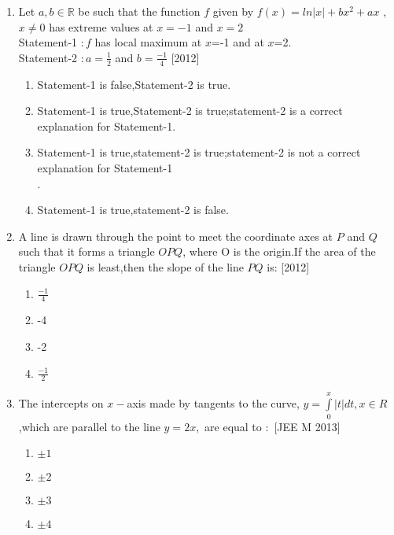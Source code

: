 \documentclass[journal,12pt,twocolumn]{IEEEtran}
\theoremstyle{remark}
\begin{document}
\begin{enumerate}
\item Let $a,b\in \mathbb R$ be such that the function $f$ given by $f(x)=ln|x|+bx^{2}+ax$ , $x \neq 0$ has extreme values at $x=-1$ and $x=2$\\
Statement-1 $: f$ has local maximum at $x$=-1 and at $x$=2.\\
Statement-2 $: a=\frac{1}{2}$ and $b=\frac{-1}{4}$ \hfill{[2012]}\\
\begin{enumerate}
    \item Statement-1 is false,Statement-2 is true.\\
    \item Statement-1 is true,Statement-2 is true;statement-2 is a correct explanation for Statement-1.\\
    \item Statement-1 is true,statement-2 is true;statement-2 is not a correct explanation for Statement-1\\.
    \item Statement-1 is true,statement-2 is false.\\
\end{enumerate}

\item A line is drawn through the point to meet the coordinate axes at $P$ and $Q$ such that it forms a triangle $OPQ$, where O is the origin.If the area of the triangle $OPQ$ is least,then the slope of the line $PQ$ is: \hfill{[2012]}\\
\begin{enumerate}
    \item  $\frac{-1}{4}$\\
    \item  -4\\
    \item  -2\\
    \item  $\frac{-1}{2}$\\
\end{enumerate}
\item The intercepts on $x-$axis made by tangents to the curve, $y=\int\limits_0^x|t|dt,x\in R$,which are parallel to the line $y=2x,$ are equal to $:$ {[JEE M 2013]}\\
\begin{enumerate}
    \item  $\pm1$\\
    \item  $\pm2$\\
    \item  $\pm3$\\
    \item  $\pm4$\\
    

\end{enumerate}
\end{enumerate}
\end{document}
